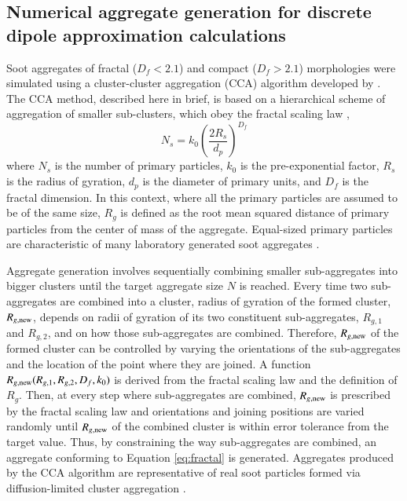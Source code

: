 \documentclass[12pt,authoryear]{elsarticle}
\begin{document}
\subsection{Numerical aggregate generation for discrete dipole approximation calculations}

Soot aggregates of fractal ($D_f < 2.1$) and compact ($D_f > 2.1$) morphologies were simulated using a cluster-cluster aggregation (CCA) algorithm developed by \citet{RN35}. The CCA method, described here in brief, is based on a hierarchical scheme of aggregation of smaller sub-clusters, which obey the fractal scaling law \citep{jullien1987aggregation},
\begin{equation}
N_s=k_0\left(\frac{2R_s}{d_p}\right)^{D_f}
\label{eq:fractal}
\end{equation}
where $N_s$ is the number of primary particles, $k_0$ is the pre-exponential factor, $R_s$ is the radius of gyration, $d_p$ is the diameter of primary units, and $D_f$ is the fractal dimension. In this context, where all the primary particles are assumed to be of the same size, $R_g$ is defined as the root mean squared distance of primary particles from the center of mass of the aggregate. Equal-sized primary particles are characteristic of many laboratory generated soot aggregates \citep{RN22,RN25}.

Aggregate generation involves sequentially combining smaller sub-aggregates into bigger clusters until the target aggregate size $N$ is reached. Every time two sub-aggregates are combined into a cluster, radius of gyration of the formed cluster, $R_{g,\rm new}$, depends on radii of gyration of its two constituent sub-aggregates, $R_{g,1}$ and $R_{g,2}$, and on how those sub-aggregates are combined. Therefore, $R_{g,\rm new}$ of the formed cluster can be controlled by varying the orientations of the sub-aggregates and the location of the point where they are joined. A function $R_{g,\rm new}(R_{g,1},R_{g,2},D_f,k_0)$ is derived from the fractal scaling law and the definition of $R_g$. Then, at every step where sub-aggregates are combined, $R_{g,\rm new}$ is prescribed by the fractal scaling law and orientations and joining positions are varied randomly until $R_{g,\rm new}$ of the combined cluster is within error tolerance from the target value. Thus, by constraining the way sub-aggregates are combined, an aggregate conforming to Equation \ref{eq:fractal} is generated. Aggregates produced by the CCA algorithm are representative of real soot particles formed via diffusion-limited cluster aggregation \citep{RN36}.
\end{document}

